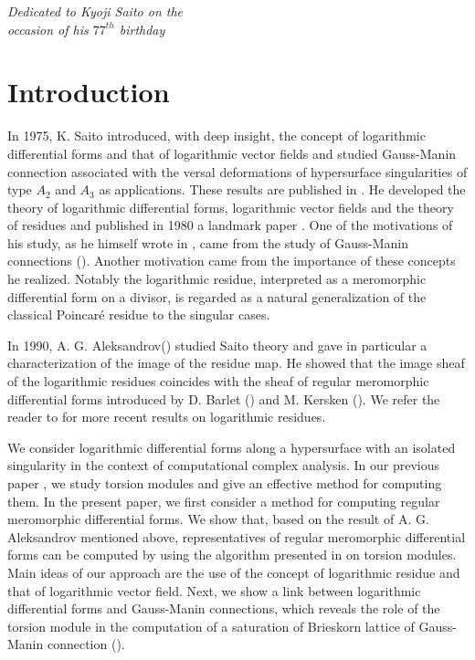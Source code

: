 \documentclass[pdftex]{arxsigma}
\begin{document}

\begin{flushright}
{\it Dedicated to Kyoji Saito on the} \\
{\it occasion of his $77^{th}$ birthday \ \ \ \ }
\end{flushright}

\section{Introduction}
In 1975, K. Saito introduced, with deep insight,  the concept of logarithmic differential forms and that of logarithmic vector fields and studied Gauss-Manin connection associated with the versal deformations of hypersurface singularities of type $A_2$ and $A_3$ as applications. These results are published in \cite{S77}. He developed the theory of logarithmic differential forms, logarithmic vector fields and the theory of residues and published in 1980 a landmark paper \cite{S}. One of the motivations of his study, as he himself wrote in \cite{S}, came from the study of Gauss-Manin connections (\cite{B,S73}). Another motivation came from the importance of these concepts he realized.
Notably the logarithmic residue, interpreted as a meromorphic differential form on a divisor, is regarded as a natural generalization of the classical Poincar\'e residue 
to the singular cases. 

In 1990, A. G. Aleksandrov(\cite{A}) studied Saito theory and gave in particular a characterization of the image of the residue map. He showed 
that the image sheaf of the logarithmic residues coincides with the sheaf of regular meromorphic differential forms introduced by D. Barlet (\cite{B}) and M. Kersken (\cite{K83,K84}).
We refer the reader to \cite{AT,Bru,CM1,CM2,GS,P} for more recent results on logarithmic residues. 

We consider logarithmic differential forms along a hypersurface with an isolated singularity in the context of computational complex analysis. In our previous paper \cite{TN20}, we study torsion modules and give an effective method for computing them. 
In the present paper, we first consider a method for computing regular meromorphic differential forms. We show that, based on the result of A. G. Aleksandrov mentioned above, representatives of regular meromorphic differential forms can be computed by using the algorithm presented in \cite{TN20} on torsion modules. Main ideas of our approach are the use of the concept of logarithmic residue and that of logarithmic vector field. Next, we show a link between logarithmic differential forms and Gauss-Manin connections, which reveals the role of the torsion module in the computation of a saturation of Brieskorn lattice of Gauss-Manin connection (\cite{B,Sch,Schu}).
\end{document}

